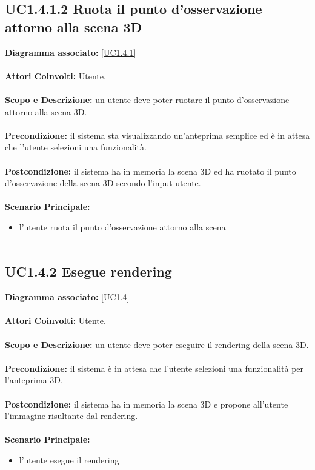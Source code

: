 \subsection{UC1.4.1.2 Ruota il punto d'osservazione attorno alla scena 3D}
\textbf{Diagramma associato:}
\ref{UC1.4.1} \\ \\
\textbf{Attori Coinvolti:}
Utente. \\ \\
\textbf{Scopo e Descrizione:}
un utente deve poter ruotare il punto d'osservazione attorno alla scena 3D. \\ \\
\textbf{Precondizione:}
il sistema sta visualizzando un'anteprima semplice ed è in attesa che l'utente selezioni una funzionalità. \\ \\
\textbf{Postcondizione:}
il sistema ha in memoria la scena 3D ed ha ruotato il punto d'osservazione della scena 3D secondo l'input utente. \\ \\
\textbf{Scenario Principale:}
\begin{itemize}
\item l'utente ruota il punto d'osservazione attorno alla scena
\\ \\ \end{itemize}


\subsection{UC1.4.2 Esegue rendering}
\textbf{Diagramma associato:}
\ref{UC1.4} \\ \\
\textbf{Attori Coinvolti:}
Utente. \\ \\
\textbf{Scopo e Descrizione:}
un utente deve poter eseguire il rendering della scena 3D. \\ \\
\textbf{Precondizione:}
il sistema è in attesa che l'utente selezioni una funzionalità per l'anteprima 3D. \\ \\
\textbf{Postcondizione:}
il sistema ha in memoria la scena 3D e propone all'utente l'immagine risultante dal rendering. \\ \\
\textbf{Scenario Principale:}
\begin{itemize}
\item l'utente esegue il rendering
\\ \\ \end{itemize}


